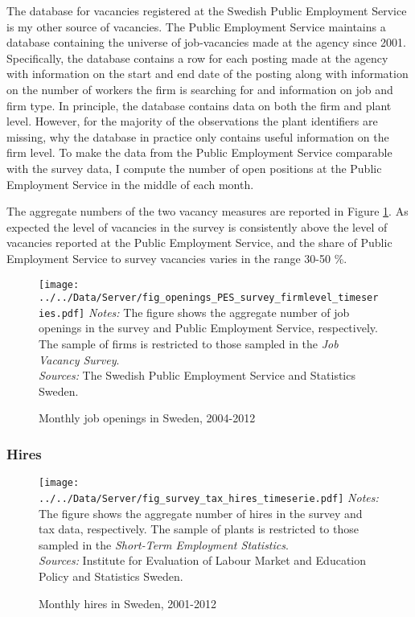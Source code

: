The database for vacancies registered at the Swedish Public Employment Service is my other source of vacancies. The  Public Employment Service maintains a database containing the universe of job-vacancies made at the agency since 2001. Specifically, the database contains a row for each posting made at the agency with information on the start and end date of the posting along with information on the number of workers the firm is searching for and information on job and firm type. In principle, the database contains data on both the firm and plant level. However, for the majority of the observations the plant identifiers are missing, why the database in practice 
only contains useful information on the firm level. To make the data from the Public Employment Service comparable with the survey data, I compute the number of open positions at the Public Employment Service in the middle of each month. 

The aggregate numbers of the two vacancy measures are reported in Figure \ref{fig:openings_timeserie}. As expected the level of vacancies in the survey is consistently above the level of vacancies reported at the Public Employment Service, and the share of Public Employment Service to survey vacancies varies in the range 30-50 \%. 

\begin{figure}[t]
\centering
\caption{Monthly job openings in Sweden, 2004-2012}
\texttt{[image: ../../Data/Server/fig\_openings\_PES\_survey\_firmlevel\_timeseries.pdf]}
\flushleft
\footnotesize{\emph{Notes:} The figure shows the aggregate number of job openings in the survey and Public Employment Service, respectively. The sample of firms is restricted to those sampled in the \emph{Job Vacancy Survey}.} \\
\footnotesize{\emph{Sources:} The Swedish Public Employment Service and Statistics Sweden.}
\label{fig:openings_timeserie}
\end{figure}

\subsubsection{Hires}

\begin{figure}[t]
\centering
\caption{Monthly hires in Sweden, 2001-2012}
\texttt{[image: ../../Data/Server/fig\_survey\_tax\_hires\_timeserie.pdf]}
\flushleft
\footnotesize{\emph{Notes:} The figure shows the aggregate number of hires in the survey and tax data, respectively. The sample of plants is restricted to those sampled in the \emph{Short-Term Employment Statistics}.} \\
\footnotesize{\emph{Sources:} Institute for Evaluation of Labour Market and Education Policy and Statistics Sweden.}
\label{fig:hires_timeserie}
\end{figure}

